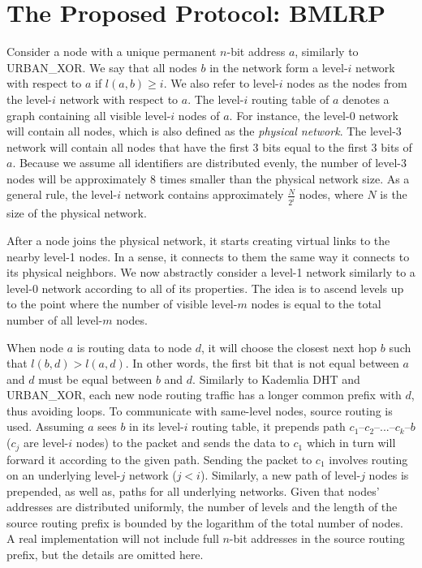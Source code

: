 \documentclass[conference]{IEEEtran}
\theoremstyle{definition}
\newcommand{\urbanxor}{URBAN\_XOR}
\begin{document}
\section{The Proposed Protocol:  BMLRP}
\label{sec:bmlrp}

Consider a node with a unique permanent $n$-bit address $a$, similarly to \urbanxor. We say that all nodes $b$ in the network form a level-$i$ network with respect to $a$ if $l(a,b) \ge i$. We also refer to level-$i$ nodes as the nodes from the level-$i$ network with respect to $a$.  The level-$i$ routing table of $a$ denotes a graph containing all visible level-$i$ nodes of $a$. For instance, the level-0 network will contain all nodes, which is also defined as the \emph{physical network}. The level-3 network will contain all nodes that have the first 3 bits equal to the first 3 bits of $a$. Because we assume all identifiers are distributed evenly, the number of level-3 nodes will be approximately 8 times smaller than the physical network size. As a general rule, the level-$i$ network contains approximately $\frac{N}{2^i}$ nodes, where $N$ is the size of the physical network.

After a node joins the physical network, it starts creating virtual links to the nearby level-1 nodes. In a sense, it connects to them the same way it connects to its physical neighbors. We now abstractly consider a level-1 network similarly to a level-0 network according
to all of its properties. The idea is to ascend levels up to the point where the number of visible level-$m$ nodes is equal to the total number of all level-$m$ nodes. 



When node $a$ is routing data to node $d$, it will choose the closest next hop $b$ such that $l(b,d) > l(a,d)$. In other words, the first bit that is not equal between $a$ and $d$ must be equal between $b$ and $d$. Similarly to Kademlia DHT and \urbanxor, each new node routing traffic has a longer common prefix with $d$, thus avoiding loops. To communicate with same-level nodes, source routing is used. Assuming $a$ sees $b$ in its level-$i$ routing table, it prepends path $c_1$--$c_2$--...--$c_k$--$b$ ($c_j$ are level-$i$ nodes) to the packet and sends the data to $c_1$ which in turn will forward it according to the given path. Sending the packet to $c_1$ involves routing on an underlying level-$j$ network ($j < i$). Similarly, a new path of level-$j$ nodes is prepended, as well as, paths for all underlying networks. Given that nodes' addresses are distributed uniformly, the number of levels and the length of the source routing prefix is bounded by the logarithm of the total number of nodes. A real implementation will not include full $n$-bit addresses in the source routing prefix, but the details are omitted here.
\end{document}
